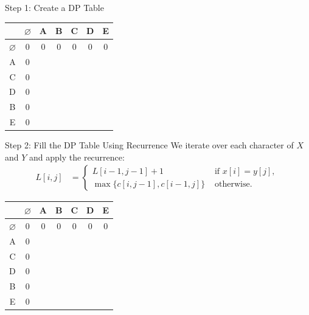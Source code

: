 \documentclass[aspectratio=169]{beamer}
\begin{document}
\begin{frame}{Step 1: Create a DP Table}
    \centering
    \begin{tabular}{|c|c|c|c|c|c|c|} \hline
                      & $\varnothing$ & A & B & C & D & E \\ \hline
        $\varnothing$ &        0      & 0 & 0 & 0 & 0 & 0 \\ \hline
               A      &        0      &   &   &   &   &   \\ \hline
               C      &        0      &   &   &   &   &   \\ \hline
               D      &        0      &   &   &   &   &   \\ \hline
               B      &        0      &   &   &   &   &   \\ \hline
               E      &        0      &   &   &   &   &   \\ \hline
    \end{tabular}
\end{frame}

\begin{frame}{Step 2: Fill the DP Table Using Recurrence}
    We iterate over each character of $X$ and $Y$ and apply the recurrence:
    \begin{equation*}
        \begin{align*}
            L[i, j] &=
                        \begin{cases}
                            L[i - 1, j - 1] + 1 & \text{ if } x[i] = y[j] \text{, } \\
                            \max \{ c[i, j - 1], c[i - 1, j] \} & \text{ otherwise.}
                        \end{cases}
        \end{align*}
    \end{equation*}
    \centering
    \begin{tabular}{|c|c|c|c|c|c|c|} \hline
                      & $\varnothing$ & A & B & C & D & E \\ \hline
        $\varnothing$ &        0      & 0 & 0 & 0 & 0 & 0 \\ \hline
               A      &        0      &   &   &   &   &   \\ \hline
               C      &        0      &   &   &   &   &   \\ \hline
               D      &        0      &   &   &   &   &   \\ \hline
               B      &        0      &   &   &   &   &   \\ \hline
               E      &        0      &   &   &   &   &   \\ \hline
    \end{tabular}
\end{frame}
\end{document}
